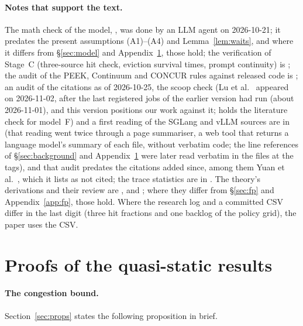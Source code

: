 \paragraph{Notes that support the text.} The math check of the model, , was done by an LLM agent on 2026-10-21; it predates the present assumptions (A1)--(A4) and Lemma~\ref{lem:waits}, and where it differs from \S\ref{sec:model} and Appendix~\ref{app:proofs}, those hold; the verification of Stage~C (three-source hit check, eviction survival times, prompt continuity) is ; the audit of the PEEK, Continuum and CONCUR rules against released code is ; an audit of the citations as of 2026-10-25, the scoop check (Lu et al.~\citep{lu2026cachetrap} appeared on 2026-11-02, after the last registered jobs of the earlier version had run (about 2026-11-01), and this version positions our work against it;  holds the literature check for model~F) and a first reading of the SGLang and vLLM sources are in  (that reading went twice through a page summariser, a web tool that returns a language model's summary of each file, without verbatim code; the line references of \S\ref{sec:background} and Appendix~\ref{app:proofs} were later read verbatim in the files at the tags), and that audit predates the citations added since, among them Yuan et al.~\citep{yuan2026agentic}, which it lists as not cited; the trace statistics are in . The theory's derivations and their review are ,  and ; where they differ from \S\ref{sec:fp} and Appendix~\ref{app:fp}, those hold. Where the research log and a committed CSV differ in the last digit (three hit fractions and one backlog of the policy grid), the paper uses the CSV.

\section{Proofs of the quasi-static results}\label{app:proofs}

\paragraph{The congestion bound.} Section~\ref{sec:props} states the following proposition in brief.

